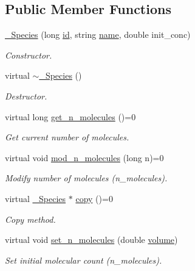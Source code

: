 \subsection*{Public Member Functions}
\begin{DoxyCompactItemize}
\item 
\hyperlink{classnw_1_1___species_af74ef3f4a59f3c8fa9ff6b1acc83be86}{\+\_\+\+Species} (long \hyperlink{classnw_1_1___species_ac42dfe1c656c17178a9649093519ebb7}{id}, string \hyperlink{classnw_1_1___species_a7b8ede09e28941beb48cf27f1247e2f9}{name}, double init\+\_\+conc)
\begin{DoxyCompactList}\small\item\em Constructor. \end{DoxyCompactList}\item 
virtual \hyperlink{classnw_1_1___species_aa3e9d32d88bf558cf6401d4b3dcf8f40}{$\sim$\+\_\+\+Species} ()
\begin{DoxyCompactList}\small\item\em Destructor. \end{DoxyCompactList}\item 
virtual long \hyperlink{classnw_1_1___species_a6e3e68477663ff511d75fb24cf01cb9f}{get\+\_\+n\+\_\+molecules} ()=0
\begin{DoxyCompactList}\small\item\em Get current number of molecules. \end{DoxyCompactList}\item 
virtual void \hyperlink{classnw_1_1___species_ac7955c9fe040d8cae8f3cae4684ed96b}{mod\+\_\+n\+\_\+molecules} (long n)=0
\begin{DoxyCompactList}\small\item\em Modify number of molecules (n\+\_\+molecules). \end{DoxyCompactList}\item 
virtual \hyperlink{classnw_1_1___species}{\+\_\+\+Species} $\ast$ \hyperlink{classnw_1_1___species_aea43d96b0b1c9e88953f40fbe58e7f29}{copy} ()=0
\begin{DoxyCompactList}\small\item\em Copy method. \end{DoxyCompactList}\item 
virtual void \hyperlink{classnw_1_1___species_a53d06cca549a83bfff71303174707926}{set\+\_\+n\+\_\+molecules} (double \hyperlink{classnw_1_1___species_a80896a55f086f468396e76ae8f1e8285}{volume})
\begin{DoxyCompactList}\small\item\em Set initial molecular count (n\+\_\+molecules). \end{DoxyCompactList}\item 

\end{DoxyCompactItemize}
